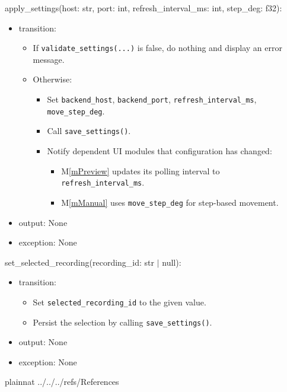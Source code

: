 \documentclass[12pt, titlepage]{article}
\newcommand{\mref}[1]{M\ref{#1}}
\begin{document}
\noindent apply\_settings(host: str, port: int, refresh\_interval\_ms: int, step\_deg: f32):
\begin{itemize}
  \item transition:
        \begin{itemize}
          \item If \texttt{validate\_settings(...)} is false, do nothing and display an error
                message.
          \item Otherwise:
                \begin{itemize}
                  \item Set \texttt{backend\_host}, \texttt{backend\_port},
                        \texttt{refresh\_interval\_ms}, \texttt{move\_step\_deg}.
                  \item Call \texttt{save\_settings()}.
                  \item Notify dependent UI modules that configuration has changed:
                        \begin{itemize}
                          \item \mref{mPreview} updates its polling interval to \texttt{refresh\_interval\_ms}.
                          \item \mref{mManual} uses \texttt{move\_step\_deg} for step-based movement.
                        \end{itemize}
                \end{itemize}
        \end{itemize}
  \item output: None
  \item exception: None
\end{itemize}

\noindent set\_selected\_recording(recording\_id: str $|$ null):
\begin{itemize}
  \item transition:
        \begin{itemize}
          \item Set \texttt{selected\_recording\_id} to the given value.
          \item Persist the selection by calling \texttt{save\_settings()}.
        \end{itemize}
  \item output: None
  \item exception: None
\end{itemize}

\newpage

 {plainnat}
 {../../../refs/References}
\end{document}
